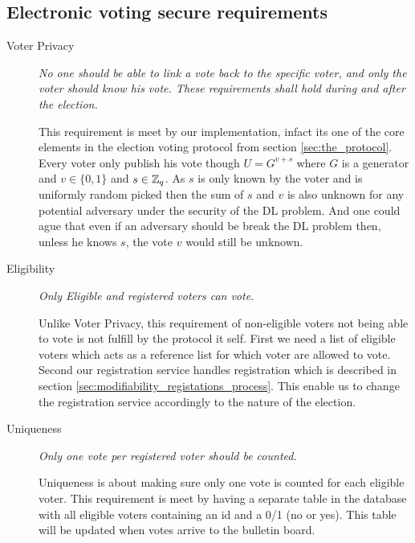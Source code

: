 \subsection{Electronic voting secure requirements} \label{sec:analyzing_electronic_voting_secure_requirements}
\begin{description}
    \item[Voter Privacy]
        \textit{No one should be able to link a vote back to the specific voter, and only the voter should
        know his vote. These requirements shall hold during and after the election.}  
        
        This requirement is meet by our implementation, infact its one of the core elements in the
        election voting protocol from section \ref{sec:the_protocol}. Every voter only publish his vote
        though $U = G^{v+s}$ where $G$ is a generator and $v \in \{0,1\}$ and $s \in \mathbb{Z}_q$. As $s$ is only
        known by the voter and is uniformly random picked then the sum of $s$ and $v$ is also unknown for any 
        potential adversary under the security of the DL problem. And one could ague that even if an
        adversary should be break the DL problem then, unless he knows $s$, the vote $v$ would still
        be unknown.
        
    \item[Eligibility]
        \textit{Only Eligible and registered voters can vote.}    
        
        Unlike Voter Privacy, this requirement of non-eligible voters not being able to vote is not
        fulfill by the protocol it self. First we need a list of eligible voters which acts as a reference list for which voter are allowed to vote. Second our registration service handles registration which is described in
        section  \ref{sec:modifiability_registations_process}. This enable us to change the registration service 
        accordingly to the nature of the election.   
      
        
    \item[Uniqueness]
        \textit{Only one vote per registered voter should be counted.}
        
        Uniqueness is about making sure only one vote is counted for each eligible
        voter. This requirement is meet by having a separate table in the database with all eligible voters 
        containing an id and a 0/1 (no or yes). This table will be updated when votes arrive to the bulletin board. 
        

\end{description}
